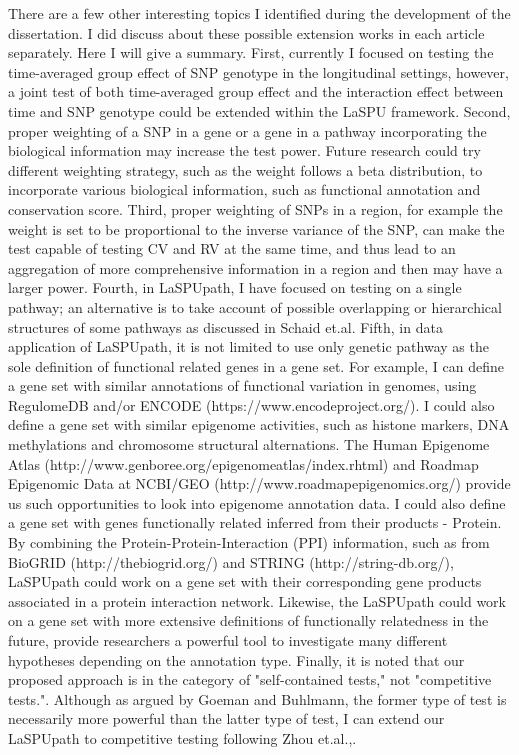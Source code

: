 \documentclass[12pt]{article}
\begin{document}
There are a few other interesting topics I identified during the development of the dissertation. I did discuss about these possible extension works in each article separately. Here I will give a summary. First, currently I focused on testing the time-averaged group effect of SNP genotype in the longitudinal settings, however, a joint test of both time-averaged group effect and the interaction effect between time and SNP genotype could be extended within the LaSPU framework. Second, proper weighting of a SNP in a gene or a gene in a pathway incorporating the biological information may increase the test power. Future research could try different weighting strategy, such as the weight follows a beta distribution, to incorporate various biological information, such as functional annotation and conservation score. Third, proper weighting of SNPs in a region, for example the weight is set to be proportional to the inverse variance of the SNP, can make the test capable of testing CV and RV at the same time, and thus lead to an aggregation of more comprehensive information in a region and then may have a larger power. Fourth, in LaSPUpath, I have focused on testing on a single pathway; an alternative is to take account of possible overlapping or hierarchical structures of some pathways as discussed in Schaid et.al.\cite{Schaid2012} Fifth, in data application of LaSPUpath, it is not limited to use only genetic pathway as the sole definition of functional related genes in a gene set. For example, I can define a gene set with similar annotations of functional variation in genomes, using RegulomeDB\cite{Boyle2012} and/or ENCODE (https://www.encodeproject.org/). I could also define a gene set with similar epigenome activities, such as histone markers, DNA methylations and chromosome structural alternations. The Human Epigenome Atlas (http://www.genboree.org/epigenomeatlas/index.rhtml) and Roadmap Epigenomic Data at NCBI/GEO (http://www.roadmapepigenomics.org/) provide us such opportunities to look into epigenome annotation data. I could also define a gene set with genes functionally related inferred from their products - Protein. By combining the Protein-Protein-Interaction (PPI) information, such as from BioGRID (http://thebiogrid.org/) and STRING (http://string-db.org/), LaSPUpath could work on a gene set with their corresponding gene products associated in a protein interaction network. Likewise, the LaSPUpath could work on a gene set with more extensive definitions of functionally relatedness in the future, provide researchers a powerful tool to investigate many different hypotheses depending on the annotation type. Finally, it is noted that our proposed approach is in the category of "self-contained tests," not "competitive tests."\cite{Goeman2007,Liu2007,Nam2008,Wang2010,Fridley2010,Fridley2011}. Although as argued by Goeman and Buhlmann,\cite{Goeman2007} the former type of test is necessarily more powerful than the latter type of test, I can extend our LaSPUpath to competitive testing following Zhou et.al.,\cite{Zhou2013}.
\end{document}
